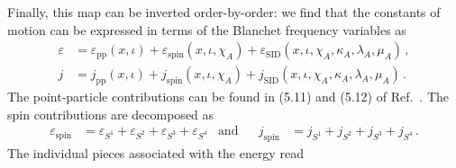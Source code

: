 \documentclass[prd,superscriptaddress,preprintnumbers,tightenlines,nofootinbib, eqsecnum]{revtex4-2}
\begin{document}
Finally, this map can be inverted order-by-order: we find that the constants of motion can be expressed in terms of the Blanchet frequency variables as 
\begin{subequations}\label{eq:varepsilon_j_pp_spin_SID}
    \begin{align}
    \label{seq:varepsilon_decomposition_pp_spin_SID}
    \varepsilon&=\varepsilon_\text{pp}(x,\iota)+\varepsilon_\text{spin}(x,\iota,\chi_A)+\varepsilon_\text{SID}(x,\iota,\chi_A,\kappa_A,\lambda_A,\mu_A) \,,\\
    \label{eq:j_decomposition_pp_spin_SID}
    j&=j_\text{pp}(x,\iota)+j_\text{spin}(x,\iota,\chi_A)+j_\text{SID}(x,\iota,\chi_A,\kappa_A,\lambda_A,\mu_A) \,.
\end{align}
\end{subequations}
The point-particle contributions can be found in (5.11) and (5.12) of Ref.~\cite{Trestini:2025yyc}.
The spin contributions are decomposed as 
\begin{align}
    \varepsilon_\text{spin} &=  \varepsilon_{S^1}+\varepsilon_{S^2}+\varepsilon_{S^3}+\varepsilon_{S^4} &\text{and}&&
    j_\text{spin} &=  j_{S^1}+j_{S^2}+j_{S^3}+j_{S^4}\,.
\end{align}
The individual pieces associated with the energy read
\end{document}
